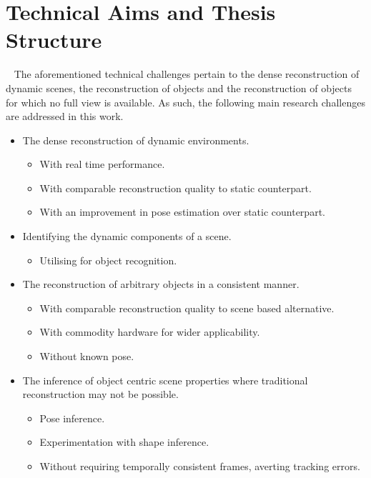 \section{Technical Aims and Thesis Structure}
~\label{sec:intro_aims_structure}
The aforementioned technical challenges pertain to the dense reconstruction of dynamic scenes, the 
reconstruction of objects and the reconstruction of objects for which no full view is available. As 
such, the following main research challenges are addressed in this work.
\begin{itemize}
  \item The dense reconstruction of dynamic environments.
  \begin{itemize}
    \item With real time performance.
    \item With comparable reconstruction quality to static counterpart.
    \item With an improvement in pose estimation over static counterpart.
  \end{itemize}
  \item Identifying the dynamic components of a scene.
  \begin{itemize}
    \item Utilising for object recognition.
  \end{itemize}
  \item The reconstruction of arbitrary objects in a consistent manner.
  \begin{itemize}
    \item With comparable reconstruction quality to scene based alternative.
    \item With commodity hardware for wider applicability.
    \item Without known pose.
  \end{itemize}
  \item The inference of object centric scene properties where traditional reconstruction 
may not be possible.
  \begin{itemize}
    \item Pose inference.
    \item Experimentation with shape inference.
    \item Without requiring temporally consistent frames, averting tracking errors.
  \end{itemize}
\end{itemize}

